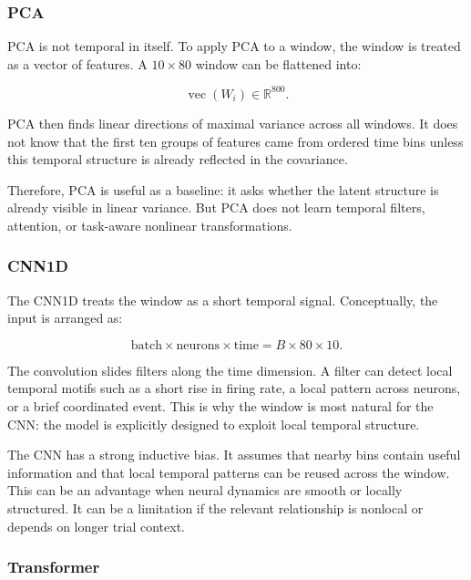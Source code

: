 \documentclass[11pt]{article}
\begin{document}
\subsubsection{PCA}

PCA is not temporal in itself. To apply PCA to a window, the window is treated
as a vector of features. A $10 \times 80$ window can be flattened into:

\begin{equation}
\operatorname{vec}(W_i) \in \mathbb{R}^{800}.
\end{equation}

PCA then finds linear directions of maximal variance across all windows. It
does not know that the first ten groups of features came from ordered time
bins unless this temporal structure is already reflected in the covariance.

Therefore, PCA is useful as a baseline: it asks whether the latent structure is
already visible in linear variance. But PCA does not learn temporal filters,
attention, or task-aware nonlinear transformations.

\subsubsection{CNN1D}

The CNN1D treats the window as a short temporal signal. Conceptually, the
input is arranged as:

\begin{equation}
\text{batch} \times \text{neurons} \times \text{time}
=
B \times 80 \times 10.
\end{equation}

The convolution slides filters along the time dimension. A filter can detect
local temporal motifs such as a short rise in firing rate, a local pattern
across neurons, or a brief coordinated event. This is why the window is most
natural for the CNN: the model is explicitly designed to exploit local
temporal structure.

The CNN has a strong inductive bias. It assumes that nearby bins contain useful
information and that local temporal patterns can be reused across the window.
This can be an advantage when neural dynamics are smooth or locally structured.
It can be a limitation if the relevant relationship is nonlocal or depends on
longer trial context.

\subsubsection{Transformer}
\end{document}
